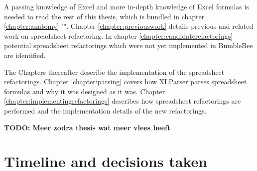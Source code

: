 \documentclass[12pt,a4paper,onecolumn,oneside,parskip]{memoir}
\newcommand{\todo}[1]{\textbf{TODO: #1}}
\begin{document}
A passing knowledge of Excel and more in-depth knowledge of Excel formulas is needed to read the rest of this thesis, which is bundled in chapter \ref{chapter:anatomy} "".
Chapter \ref{chapter:previouswork} details previous and related work on spreadsheet refactoring.
In chapter \ref{chapter:candidaterefactorings} potential spreadsheet refactorings which were not yet implemented in BumbleBee are identified.

The Chapters thereafter describe the implementation of the spreadsheet refactorings.
Chapter \ref{chapter:parsing} covers how XLParser parses spreadsheet formulas and why it was designed as it was.
Chapter \ref{chapter:implementingrefactorings} describes how spreadsheet refactorings are performed and the implementation details of the new refactorings.

\todo{Meer zodra thesis wat meer vlees heeft}

\clearpage
\section{Timeline and decisions taken}
\end{document}
